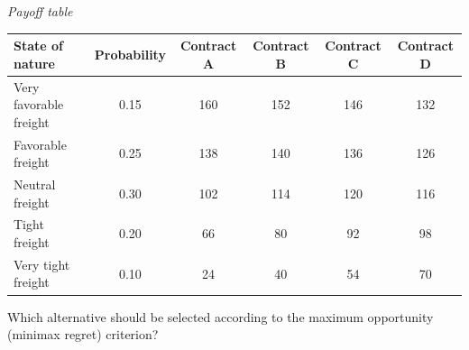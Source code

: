 \begin{ExamProblems}
		\begin{center}
			\textit{Payoff table}
			\begin{tabular}{l c c c c c}
				\toprule
				State of nature & Probability & Contract A & Contract B & Contract C & Contract D \\
				\midrule
				Very favorable freight & 0.15 & 160 & 152 & 146 & 132 \\
				Favorable freight & 0.25 & 138 & 140 & 136 & 126 \\
				Neutral freight & 0.30 & 102 & 114 & 120 & 116 \\
				Tight freight & 0.20 & 66 & 80 & 92 & 98 \\
				Very tight freight & 0.10 & 24 & 40 & 54 & 70 \\
				\bottomrule
			\end{tabular}
		\end{center}

		Which alternative should be selected according to the maximum opportunity (minimax regret) criterion?


\end{ExamProblems}
